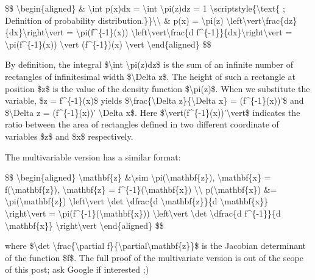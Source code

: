 \$\$ \textbackslash begin\{aligned\} \& \textbackslash int p(x)dx = \textbackslash int \textbackslash pi(z)dz = 1 \textbackslash scriptstyle\{\textbackslash text\{ ; Definition of probability distribution.\}\}\textbackslash\textbackslash{} \& p(x) = \textbackslash pi(z) \textbackslash left\textbackslash vert\textbackslash frac\{dz\}\{dx\}\textbackslash right\textbackslash vert = \textbackslash pi(f\^{}\{-1\}(x)) \textbackslash left\textbackslash vert\textbackslash frac\{d f\^{}\{-1\}\}\{dx\}\textbackslash right\textbackslash vert = \textbackslash pi(f\^{}\{-1\}(x)) \textbackslash vert (f\^{}\{-1\})\textquotesingle(x) \textbackslash vert \textbackslash end\{aligned\} \$\$

By definition, the integral \$\textbackslash int \textbackslash pi(z)dz\$ is the sum of an infinite number of rectangles of infinitesimal width \$\textbackslash Delta z\$. The height of such a rectangle at position \$z\$ is the value of the density function \$\textbackslash pi(z)\$. When we substitute the variable, \$z = f\^{}\{-1\}(x)\$ yields \$\textbackslash frac\{\textbackslash Delta z\}\{\textbackslash Delta x\} = (f\^{}\{-1\}(x))'\$ and \$\textbackslash Delta z = (f\^{}\{-1\}(x))' \textbackslash Delta x\$. Here \$\textbackslash vert(f\^{}\{-1\}(x))'\textbackslash vert\$ indicates the ratio between the area of rectangles defined in two different coordinate of variables \$z\$ and \$x\$ respectively.

The multivariable version has a similar format:

\$\$ \textbackslash begin\{aligned\} \textbackslash mathbf\{z\} \&\textbackslash sim \textbackslash pi(\textbackslash mathbf\{z\}), \textbackslash mathbf\{x\} = f(\textbackslash mathbf\{z\}), \textbackslash mathbf\{z\} = f\^{}\{-1\}(\textbackslash mathbf\{x\}) \textbackslash\textbackslash{} p(\textbackslash mathbf\{x\}) \&= \textbackslash pi(\textbackslash mathbf\{z\}) \textbackslash left\textbackslash vert \textbackslash det \textbackslash dfrac\{d \textbackslash mathbf\{z\}\}\{d \textbackslash mathbf\{x\}\} \textbackslash right\textbackslash vert = \textbackslash pi(f\^{}\{-1\}(\textbackslash mathbf\{x\})) \textbackslash left\textbackslash vert \textbackslash det \textbackslash dfrac\{d f\^{}\{-1\}\}\{d \textbackslash mathbf\{x\}\} \textbackslash right\textbackslash vert \textbackslash end\{aligned\} \$\$

where \$\textbackslash det \textbackslash frac\{\textbackslash partial f\}\{\textbackslash partial\textbackslash mathbf\{z\}\}\$ is the Jacobian determinant of the function \$f\$. The full proof of the multivariate version is out of the scope of this post; ask Google if interested ;)

